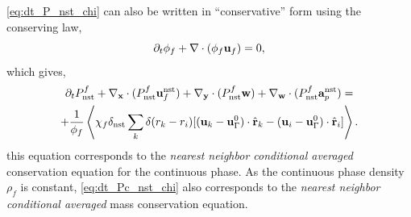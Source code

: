 \ref{eq:dt_P_nst_chi} can also be written in ``conservative'' form using the conserving law, 
\begin{equation}
    \partial_t \phi_f 
    + \mathbf{\nabla}\cdot(
        \phi_f
        \textbf{u}_f 
        ) 
    = 0, 
\end{equation}
which gives, 
\begin{multline}
    \pddt P_\text{nst}^f
    + 
    \pddx \cdot (
        P_\text{nst}^f
        \textbf{u}_f^\text{nst}
    )
    + \pddy \cdot (
        P_\text{nst}^f
        \textbf{w}
    )
    +
    \pddw \cdot (  
        P_\text{nst}^f
        \textbf{a}_p^\text{nst} 
    )
    = \\
    + \frac{1}{\phi_f}\avg{
     \chi_f \delta_\text{nst}
    \sum_k 
    \delta(r_k - r_i)
    [(\textbf{u}_k - \textbf{u}_\Gamma^0) \cdot \hat{\textbf{r}}_k - (\textbf{u}_i- \textbf{u}_\Gamma^0)  \cdot \hat{\textbf{r}}_i]}.
    \label{eq:dt_Pc_nst_chi}
\end{multline}
this equation corresponds to the \textit{nearest neighbor conditional averaged} conservation equation for the continuous phase.
As the continuous phase density $\rho_f$ is constant, \ref{eq:dt_Pc_nst_chi} also corresponds to the  \textit{nearest neighbor conditional averaged} mass conservation equation.  

